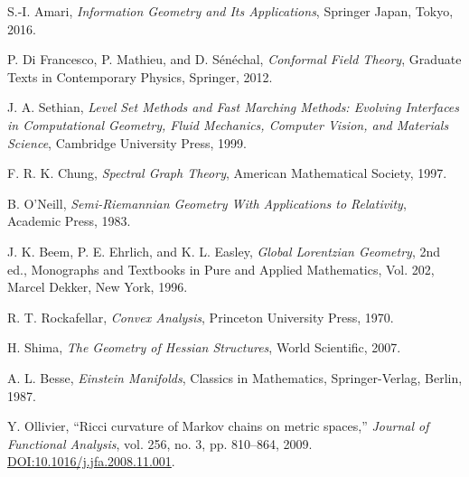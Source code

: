 \documentclass[twoside,twocolumn]{article}
\begin{document}
\begin{thebibliography}{99}


S.-I. Amari,
\textit{Information Geometry and Its Applications},
Springer Japan, Tokyo, 2016.

P. Di Francesco, P. Mathieu, and D. S\'en\'echal, %
\textit{Conformal Field Theory},
Graduate Texts in Contemporary Physics, Springer, 2012.

J. A. Sethian,
\textit{Level Set Methods and Fast Marching Methods: Evolving Interfaces in Computational Geometry, Fluid Mechanics, Computer Vision, and Materials Science},
Cambridge University Press, 1999.

F. R. K. Chung,
\textit{Spectral Graph Theory},
American Mathematical Society, 1997.


B. O'Neill,
\textit{Semi-Riemannian Geometry With Applications to Relativity},
Academic Press, 1983.

J. K. Beem, P. E. Ehrlich, and K. L. Easley,
\textit{Global Lorentzian Geometry},
2nd ed., Monographs and Textbooks in Pure and Applied Mathematics, Vol. 202, Marcel Dekker, New York, 1996.

R. T. Rockafellar,
\textit{Convex Analysis},
Princeton University Press, 1970.

H. Shima,
\textit{The Geometry of Hessian Structures},
World Scientific, 2007.

A. L. Besse,
\textit{Einstein Manifolds},
Classics in Mathematics, Springer-Verlag, Berlin, 1987. %

Y. Ollivier,
``Ricci curvature of Markov chains on metric spaces,''
\textit{Journal of Functional Analysis}, vol. 256, no. 3, pp. 810--864, 2009.
\href{https://doi.org/10.1016/j.jfa.2008.11.001}{DOI:10.1016/j.jfa.2008.11.001}.


\end{thebibliography}
\end{document}
